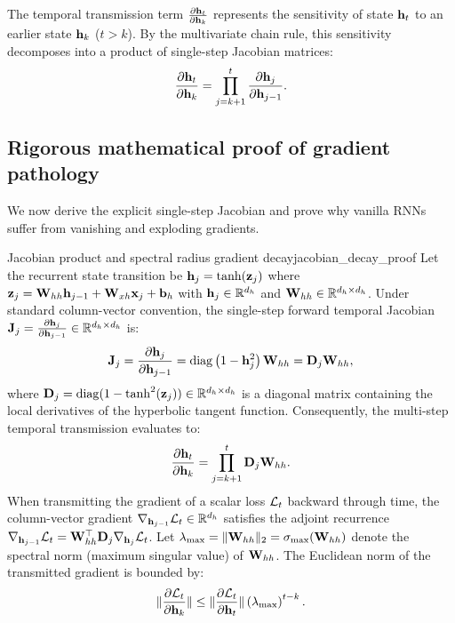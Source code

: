 \documentclass[../../main.tex]{subfiles}
\begin{document}
The temporal transmission term $\frac{\partial \mathbf{h}_t}{\partial \mathbf{h}_k}$ represents the sensitivity of state $\mathbf{h}_t$ to an earlier state $\mathbf{h}_k$ ($t > k$). By the multivariate chain rule, this sensitivity decomposes into a product of single-step Jacobian matrices:
\begin{equation}
\label{eq:temporal_jacobian_product}
\frac{\partial \mathbf{h}_t}{\partial \mathbf{h}_k} = \prod_{j=k+1}^t \frac{\partial \mathbf{h}_j}{\partial \mathbf{h}_{j-1}}.
\end{equation}

\subsection{Rigorous mathematical proof of gradient pathology}
We now derive the explicit single-step Jacobian and prove why vanilla RNNs suffer from vanishing and exploding gradients.

\begin{theorem}{Jacobian product and spectral radius gradient decay}{jacobian_decay_proof}
Let the recurrent state transition be $\mathbf{h}_j = \tanh(\mathbf{z}_j)$ where $\mathbf{z}_j = \mathbf{W}_{hh} \mathbf{h}_{j-1} + \mathbf{W}_{xh} \mathbf{x}_j + \mathbf{b}_h$ with $\mathbf{h}_j \in \mathbb{R}^{d_h}$ and $\mathbf{W}_{hh} \in \mathbb{R}^{d_h \times d_h}$.
Under standard column-vector convention, the single-step forward temporal Jacobian $\mathbf{J}_j = \frac{\partial \mathbf{h}_j}{\partial \mathbf{h}_{j-1}} \in \mathbb{R}^{d_h \times d_h}$ is:
\begin{equation}
\label{eq:single_step_jacobian}
\mathbf{J}_j = \frac{\partial \mathbf{h}_j}{\partial \mathbf{h}_{j-1}} = \operatorname{diag}\left( 1 - \mathbf{h}_j^2 \right) \mathbf{W}_{hh} = \mathbf{D}_j \mathbf{W}_{hh},
\end{equation}
where $\mathbf{D}_j = \operatorname{diag}(1 - \tanh^2(\mathbf{z}_j)) \in \mathbb{R}^{d_h \times d_h}$ is a diagonal matrix containing the local derivatives of the hyperbolic tangent function. Consequently, the multi-step temporal transmission evaluates to:
\begin{equation}
\label{eq:full_chain_product}
\frac{\partial \mathbf{h}_t}{\partial \mathbf{h}_k} = \prod_{j=k+1}^t \mathbf{D}_j \mathbf{W}_{hh}.
\end{equation}
When transmitting the gradient of a scalar loss $\mathcal{L}_t$ backward through time, the column-vector gradient $\nabla_{\mathbf{h}_{j-1}} \mathcal{L}_t \in \mathbb{R}^{d_h}$ satisfies the adjoint recurrence $\nabla_{\mathbf{h}_{j-1}} \mathcal{L}_t = \mathbf{W}_{hh}^\top \mathbf{D}_j \nabla_{\mathbf{h}_j} \mathcal{L}_t$.
Let $\lambda_{\max} = \|\mathbf{W}_{hh}\|_2 = \sigma_{\max}(\mathbf{W}_{hh})$ denote the spectral norm (maximum singular value) of $\mathbf{W}_{hh}$. The Euclidean norm of the transmitted gradient is bounded by:
\begin{equation}
\label{eq:gradient_bound}
\lVert\frac{\partial \mathcal{L}_t}{\partial \mathbf{h}_k}\rVert \le \lVert\frac{\partial \mathcal{L}_t}{\partial \mathbf{h}_t}\rVert \left( \lambda_{\max} \right)^{t-k}.
\end{equation}
\end{theorem}
\end{document}
